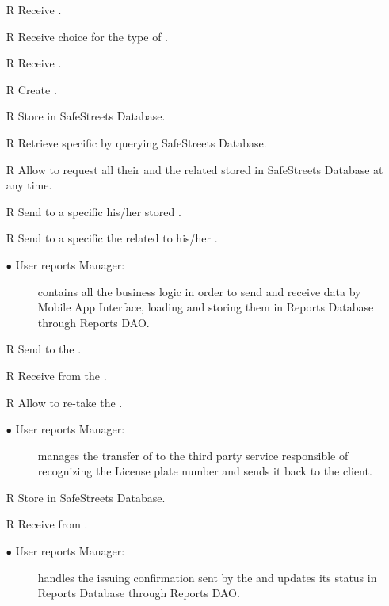 \documentclass[../DD.tex]{subfiles}
\begin{document}
\begin{itemize}
	\item[R\subs{4}]Receive .
	\item[R\subs{5}]Receive  choice for the type of .
	\item[R\subs{6}]Receive .
	\item[R\subs{9}]Create .
	\item[R\subs{10}]Store  in SafeStreets Database.
	\item[R\subs{14}]Retrieve specific  by querying SafeStreets Database.
	\item[R\subs{20}]Allow  to request all their  and the related  stored in SafeStreets Database at any time.
	\item[R\subs{21}]Send to a specific  his/her stored .
	\item[R\subs{22}]Send to a specific  the  related to his/her .
	\begin{description}
	\item[$\bullet$ User reports Manager:] contains all the business logic in order to send and receive  data by Mobile App Interface, loading and storing them in Reports Database through Reports DAO.
	\end{description}

	\item[R\subs{7}]Send  to the .
	\item[R\subs{8}]Receive  from the .
	\item[R\subs{26}]Allow  to re-take the .
	\begin{description}
	\item[$\bullet$ User reports Manager:] manages the transfer of  to the third party service responsible of recognizing the License plate number and sends it back to the client.
	\end{description}

	\item[R\subs{12}]Store  in SafeStreets Database.
	\item[R\subs{25}]Receive  from .	
	\begin{description}
	\item[$\bullet$ User reports Manager:] handles the  issuing confirmation sent by the  and updates its status in Reports Database through Reports DAO.
	\end{description}


\end{itemize}
\end{document}
